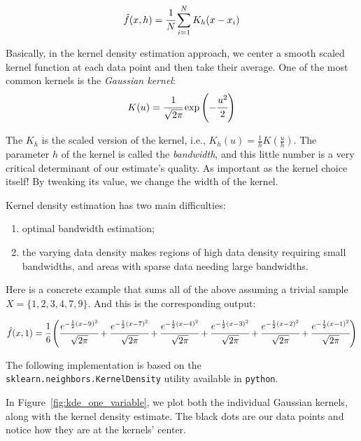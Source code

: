 \begin{equation}
\hat{f}(x,h)=\cfrac{1}{N}\sum_{i=1}^{N}K_h(x-x_i)
\end{equation}

Basically, in the kernel density estimation approach, we center a smooth scaled kernel function at each data point and then take their average. One of the most common kernels is the \emph{Gaussian kernel}:
\begin{equation}
K(u)=\cfrac{1}{\sqrt{2\pi}}\exp\left(-\cfrac{u^2}{2}\right)
\end{equation}

The $K_h$ is the scaled version of the kernel, i.e., $K_h(u)=\frac{1}{h}K(\frac{u}{h})$. The parameter $h$ of the kernel is called the \emph{bandwidth}, and this little number is a very critical determinant of our estimate's quality. As important as the kernel choice itself! By tweaking its value, we change the width of the kernel.

Kernel density estimation has two main difficulties:
\begin{enumerate}
\item optimal bandwidth estimation;
\item the varying data density makes regions of high data density requiring small bandwidths, and areas with sparse data needing large bandwidths.
\end{enumerate}

Here is a concrete example that sums all of the above assuming a trivial sample $X=\{1,2,3,4,7,9\}$.
And this is the corresponding output:

\begin{equation}
\hat{f}(x, 1)=\cfrac{1}{6}\left(
  \cfrac{e^{-\frac{1}{2}(x-9)^2}}{\sqrt{2\pi}}+
  \cfrac{e^{-\frac{1}{2}(x-7)^2}}{\sqrt{2\pi}}+
  \cfrac{e^{-\frac{1}{2}(x-4)^2}}{\sqrt{2\pi}}+
  \cfrac{e^{-\frac{1}{2}(x-3)^2}}{\sqrt{2\pi}}+
  \cfrac{e^{-\frac{1}{2}(x-2)^2}}{\sqrt{2\pi}}+
  \cfrac{e^{-\frac{1}{2}(x-1)^2}}{\sqrt{2\pi}}\right)
\end{equation}

The following implementation is based on the \texttt{sklearn.neighbors.KernelDensity} utility available in \texttt{python}.


In Figure~\ref{fig:kde_one_variable}, we plot both the individual Gaussian kernels, along with the kernel density estimate. The black dots are our data points and notice how they are at the kernels' center.

